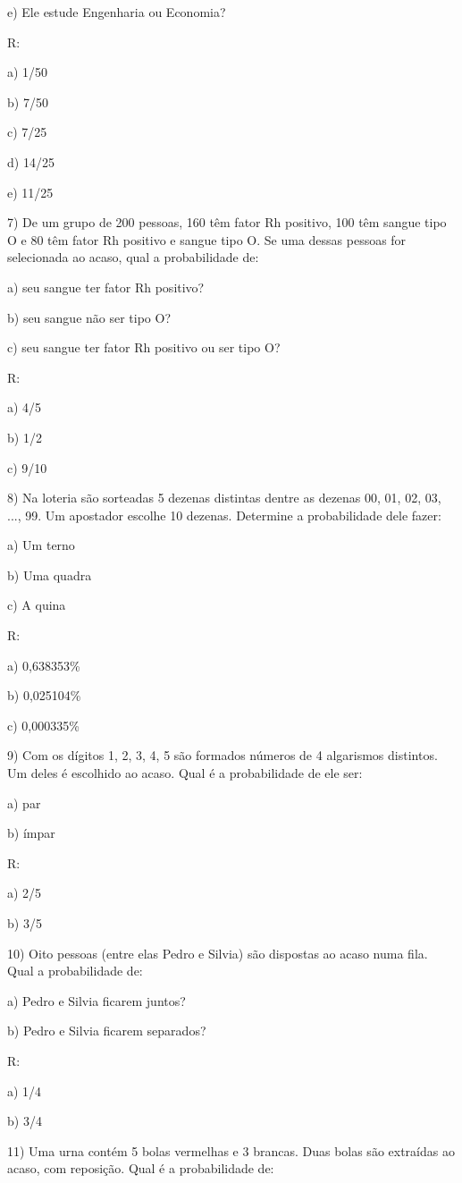 e) Ele estude Engenharia ou Economia?

R:

a) 1/50

b) 7/50

c) 7/25

d) 14/25

e) 11/25

7) De um grupo de 200 pessoas, 160 têm fator Rh positivo, 100 têm sangue
tipo O e 80 têm fator Rh positivo e sangue tipo O. Se uma dessas pessoas
for selecionada ao acaso, qual a probabilidade de:

a) seu sangue ter fator Rh positivo?

b) seu sangue não ser tipo O?

c) seu sangue ter fator Rh positivo ou ser tipo O?

R:

a) 4/5

b) 1/2

c) 9/10

8) Na loteria são sorteadas 5 dezenas distintas dentre as dezenas 00,
01, 02, 03, ..., 99. Um apostador escolhe 10 dezenas. Determine a
probabilidade dele fazer:

a) Um terno

b) Uma quadra

c) A quina

R:

a) 0,638353\%

b) 0,025104\%

c) 0,000335\%

9) Com os dígitos 1, 2, 3, 4, 5 são formados números de 4 algarismos
distintos. Um deles é escolhido ao acaso. Qual é a probabilidade de ele
ser:

a) par

b) ímpar

R:

a) 2/5

b) 3/5

10) Oito pessoas (entre elas Pedro e Silvia) são dispostas ao acaso numa
fila. Qual a probabilidade de:

a) Pedro e Silvia ficarem juntos?

b) Pedro e Silvia ficarem separados?

R:

a) 1/4

b) 3/4

11) Uma urna contém 5 bolas vermelhas e 3 brancas. Duas bolas são
extraídas ao acaso, com reposição. Qual é a probabilidade de:

